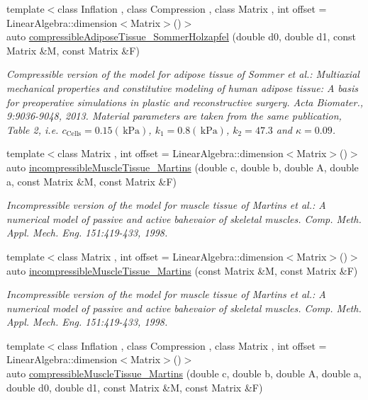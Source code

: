 \begin{DoxyCompactItemize}
{\footnotesize template$<$class Inflation , class Compression , class Matrix , int offset = Linear\-Algebra\-::dimension$<$\-Matrix$>$()$>$ }\\auto \hyperlink{group__Biomechanics_ga3f3e0d2799629dab092114d59233bc03}{compressible\-Adipose\-Tissue\-\_\-\-Sommer\-Holzapfel} (double d0, double d1, const Matrix \&M, const Matrix \&F)
\begin{DoxyCompactList}\small\item\em Compressible version of the model for adipose tissue of Sommer et al.\-: Multiaxial mechanical properties and constitutive modeling of human adipose tissue\-: A basis for preoperative simulations in plastic and reconstructive surgery. Acta Biomater., 9\-:9036-\/9048, 2013. Material parameters are taken from the same publication, Table 2, i.\-e. $c_\mathrm{Cells}=0.15 (\,\mathrm{kPa})$, $k_1=0.8 (\,\mathrm{kPa})$, $k_2=47.3$ and $\kappa=0.09$. \end{DoxyCompactList}\item 
{\footnotesize template$<$class Matrix , int offset = Linear\-Algebra\-::dimension$<$\-Matrix$>$()$>$ }\\auto \hyperlink{group__Biomechanics_ga6c85de42ee96ce8b8505dd22d2327e12}{incompressible\-Muscle\-Tissue\-\_\-\-Martins} (double c, double b, double A, double a, const Matrix \&M, const Matrix \&F)
\begin{DoxyCompactList}\small\item\em Incompressible version of the model for muscle tissue of Martins et al.\-: A numerical model of passive and active bahevaior of skeletal muscles. Comp. Meth. Appl. Mech. Eng. 151\-:419-\/433, 1998. \end{DoxyCompactList}\item 
{\footnotesize template$<$class Matrix , int offset = Linear\-Algebra\-::dimension$<$\-Matrix$>$()$>$ }\\auto \hyperlink{group__Biomechanics_ga79c7b90af1f57945e9c1c8e547d6e9ee}{incompressible\-Muscle\-Tissue\-\_\-\-Martins} (const Matrix \&M, const Matrix \&F)
\begin{DoxyCompactList}\small\item\em Incompressible version of the model for muscle tissue of Martins et al.\-: A numerical model of passive and active bahevaior of skeletal muscles. Comp. Meth. Appl. Mech. Eng. 151\-:419-\/433, 1998. \end{DoxyCompactList}\item 
{\footnotesize template$<$class Inflation , class Compression , class Matrix , int offset = Linear\-Algebra\-::dimension$<$\-Matrix$>$()$>$ }\\auto \hyperlink{group__Biomechanics_gaaa21bcb424d6ea5a591e454bcfa9cec1}{compressible\-Muscle\-Tissue\-\_\-\-Martins} (double c, double b, double A, double a, double d0, double d1, const Matrix \&M, const Matrix \&F)

\end{DoxyCompactItemize}
